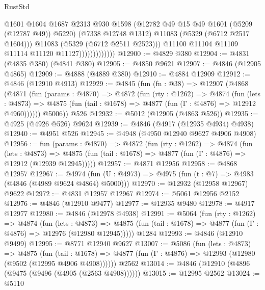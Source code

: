 \begin{lexlean}{RustStd}
\begin{coremodule}
                                  @1601
                                  @1604
                                  @1687
                                  @2313
                                  @930
                                  @1598
                                  (@12782 @49 @15 @49 @1601 (@5209 (@12787 @49)) @5220)
                                  (@7338 @12748 @1312)
                                  @11083
                                  (@5329 (@6712 @2517 @1604)))
                                @11083
                                (@5329 (@6712 @2511 @2523)))
                              @11100
                              @11104
                              @11109
                              @11114
                              @11120
                              @11127)))))))))))))
@12900 := @4829 @380
@12904 := @4831 (@4835 @380) (@4841 @380)
@12905 := @4850 @9621
@12907 := @4846 (@12905 @4865)
@12909 := @4888 (@4889 @380)
@12910 := @4884 @12909
@12912 := @4846 (@12910 @4913)
@12929 := @4845
    (fun (fn : @38) =>
    @12907
      (@4868
        (@4871
          (fun (params : @4870) =>
          @4872
            (fun (rty : @1262) =>
            @4874
              (fun (lets : @4873) =>
              @4875 (fun (tail : @1678) => @4877 (fun (Γ : @4876) => @12912 @4960))))))
        @5006))
    @526
@12932 := @5012 (@12905 (@4863 @526))
@12935 := @4925 (@4926 @526) @9624
@12939 := @4846 (@4917 (@12935 @4934) @4938)
@12940 := @4951 @526
@12945 := @4948 (@4950 @12940 @9627 @4906 @4908)
@12956 := fun (params : @4870) =>
  @4872
    (fun (rty : @1262) =>
    @4874
      (fun (lets : @4873) =>
      @4875 (fun (tail : @1678) => @4877 (fun (Γ : @4876) => @12912 (@12939 @12945)))))
@12957 := @4871 @12956
@12958 := @4868 @12957
@12967 := @4974 (fun (U : @4973) => @4975 (fun (t : @7) => @4983 (@4846 (@4989 @9624 @4864) @5000)))
@12970 := @12932 (@12958 @12967) @9622
@12972 := @4831 @12957 @12967
@12974 := @5061 @12956 @2152
@12976 := @4846 (@12910 @9477)
@12977 := @12935 @9480
@12978 := @4917 @12977
@12980 := @4846 (@12978 @4938)
@12991 := @5064
    (fun (rty : @1262) =>
    @4874
      (fun (lets : @4873) =>
      @4875 (fun (tail : @1678) => @4877 (fun (Γ : @4876) => @12976 (@12980 @12945)))))
    @1284
@12993 := @4846 (@12910 @9499)
@12995 := @8771 @12940 @9627
@13007 := @5086
    (fun (lets : @4873) =>
    @4875
      (fun (tail : @1678) =>
      @4877 (fun (Γ : @4876) => @12993 (@12980 (@9502 (@12995 @4906 @4908))))))
    @2562
@13014 := @4846 (@12910 (@4896 (@9475 (@9496 (@4905 (@2563 @4908))))))
@13015 := @12995 @2562
@13024 := @5110

\end{coremodule}
\end{lexlean}
